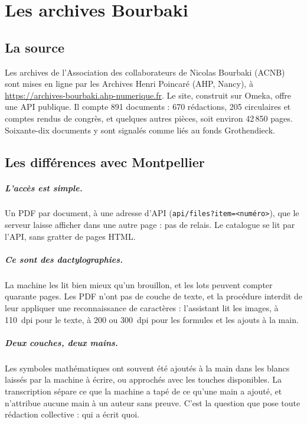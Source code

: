 \chapter{Les archives Bourbaki}\label{ch:bourbaki}

\section{La source}

Les archives de l'Association des collaborateurs de Nicolas Bourbaki (ACNB) sont mises en
ligne par les Archives Henri Poincaré (AHP, Nancy), à
\url{https://archives-bourbaki.ahp-numerique.fr}. Le site, construit sur Omeka, offre une
API publique. Il compte 891 documents : 670 rédactions, 205 circulaires et comptes rendus
de congrès, et quelques autres pièces, soit environ 42\,850 pages. Soixante-dix documents y
sont signalés comme liés au fonds Grothendieck.

\section{Les différences avec Montpellier}

\paragraph{L'accès est simple.} Un PDF par document, à une adresse d'API
(\texttt{api/files?item=<numéro>}), que le serveur laisse afficher dans une autre page :
pas de relais. Le catalogue se lit par l'API, sans gratter de pages HTML.

\paragraph{Ce sont des dactylographies.} La machine les lit bien mieux qu'un brouillon, et
les lots peuvent compter quarante pages. Les PDF n'ont pas de couche de texte, et la
procédure interdit de leur appliquer une reconnaissance de caractères : l'assistant lit
les images, à 110~dpi pour le texte, à 200 ou 300~dpi pour les formules et les ajouts à la
main.

\paragraph{Deux couches, deux mains.} Les symboles mathématiques ont souvent été ajoutés à
la main dans les blancs laissés par la machine à écrire, ou approchés avec les touches
disponibles. La transcription sépare ce que la machine a tapé de ce qu'une main a ajouté,
et n'attribue aucune main à un auteur sans preuve. C'est la question que pose toute
rédaction collective : qui a écrit quoi.

